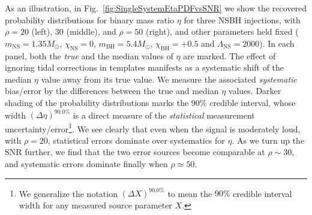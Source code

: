 \documentclass[aps,prd,amsmath,floats,floatfix, twocolumn,
superscriptaddress,nofootinbib,showpacs]{revtex4-1}
\newcommand{\lambdans}{\Lambda_\mathrm{NS}}
\newcommand{\chibh}{\chi_\mathrm{BH}}
\newcommand{\chins}{\chi_\mathrm{NS}}
\newcommand{\mbh}{m_\mathrm{BH}}
\newcommand{\mns}{m_\mathrm{NS}}
\begin{document}
As an illustration, in Fig.~\ref{fig:SingleSystemEtaPDFvsSNR} we show the
recovered probability distributions for binary mass ratio $\eta$ for
three NSBH injections, with $\rho=20$ (left), $30$ (middle), and $\rho=50$
(right), and other parameters held fixed ($\mns=1.35M_\odot$, $\chins=0$,
$\mbh=5.4M_\odot$, $\chibh=+0.5$ and $\lambdans=2000$). In each panel, both
the {\it true} and the median values of $\eta$ are marked.
The effect of ignoring tidal corrections in templates manifests as a systematic
shift of the median $\eta$ value away from its true value. We measure
the associated {\it systematic} bias/error by the differences between the
true and median $\eta$ values. Darker
shading of the probability distributions marks the $90\%$ credible interval,
whose width $(\Delta\eta)^{90.0\%}$ is a direct measure of the
{\it statistical} measurement uncertainty/error\footnote{We generalize the
notation $(\Delta X)^{90.0\%}$ to mean the $90\%$ credible interval width
for any measured source parameter $X$.}.
% 
We see clearly that even when the signal is moderately loud, with $\rho=20$,
statistical errors dominate over systematics for $\eta$. As we turn up the SNR
further, we find that the two error sources become comparable at $\rho\sim 30$,
and systematic errors dominate finally when $\rho\simeq 50$.
\end{document}
